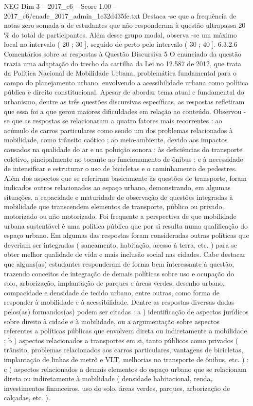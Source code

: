 \begin{textsample}{NEG Dim 3 – 2017\_c6 – Score 1.00 – 2017\_c6/enade\_2017\_admin\_1e32d435fe.txt}
Destaca -se que a frequência de notas zero somada a de estudantes que não responderam à questão ultrapassa 20 \% do total de participantes.
Além desse grupo modal, observa -se um máximo local no intervalo ( 20 ; 30 ], seguido de perto pelo intervalo ( 30 ; 40 ]. 6.3.2.6 Comentários sobre as respostas à Questão Discursiva 5 O enunciado da questão trazia uma adaptação do trecho da cartilha da Lei no 12.587 de 2012, que trata da Política Nacional de Mobilidade Urbana, problemática fundamental para o campo do planejamento urbano, envolvendo a acessibilidade urbana como política pública e direito constitucional.
Apesar de abordar tema atual e fundamental do urbanismo, dentre as três questões discursivas específicas, as respostas refletiram que essa foi a que gerou maiores dificuldades em relação ao conteúdo.
Observou -se que as respostas se relacionaram a quatro fatores mais recorrentes : ao acúmulo de carros particulares como sendo um dos problemas relacionados à mobilidade, como trânsito caótico ; ao meio-ambiente, devido aos impactos causados na qualidade do ar e na poluição sonora ; às deficiências do transporte coletivo, pincipalmente no tocante ao funcionamento de ônibus ; e à necessidade de intensificar e estruturar o uso de bicicletas e o caminhamento de pedestres.
Além dos aspectos que se referiram basicamente às questões de transporte, foram indicados outros relacionados ao espaço urbano, demonstrando, em algumas situações, a capacidade e maturidade de observação de questões integradas à mobilidade que transcendem elementos de transporte, público ou privado, motorizado ou não motorizado.
Foi frequente a perspectiva de que mobilidade urbana sustentável é uma política pública que por si resulta numa qualificação do espaço urbano.
Em algumas das respostas foram consideradas outras políticas que deveriam ser integradas ( saneamento, habitação, acesso à terra, etc. ) para se obter melhor qualidade de vida e mais inclusão social nas cidades.
Cabe destacar que alguns(as) estudantes responderam de forma bem interessante à questão, trazendo conceitos de integração de demais políticas sobre uso e ocupação do solo, arborização, implantação de parques e áreas verdes, desenho urbano, compacidade e densidade de tecido urbano, entre outras, como forma de responder à mobilidade e à acessibilidade.
Dentre as respostas diversas dadas pelos(as) formandos(as) podem ser citadas : a ) identificação de aspectos jurídicos sobre direito à cidade e à mobilidade, ou a argumentação sobre aspectos referentes a políticas públicas que envolvem direta ou indiretamente a mobilidade ; b ) aspectos relacionados a transportes em si, tanto públicos como privados ( trânsito, problemas relacionados aos carros particulares, vantagens de bicicletas, implantação de linhas de metrô e VLT, melhorias no transporte de ônibus, etc. ) ; c ) aspectos relacionados a demais elementos do espaço urbano que se relacionam direta ou indiretamente à mobilidade ( densidade habitacional, renda, investimentos financeiros, uso do solo, áreas verdes, parques, arborização de calçadas, etc. ).

\end{textsample}
